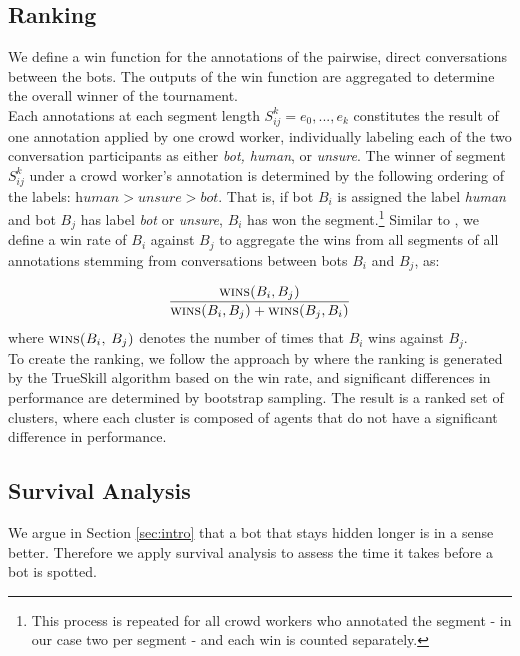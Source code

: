 \documentclass[11pt,a4paper]{article}
\begin{document}
\subsection{Ranking}
We define a win function for the annotations of the pairwise, direct conversations between the bots. The outputs of the win function are aggregated to determine the overall winner of the tournament. \\
 Each annotations at each segment length $S_{ij}^k = e_0, ... , e_{k}$ constitutes the result of one annotation applied by one crowd worker, individually labeling each of the two conversation participants as either \textit{bot, human}, or \textit{unsure}. The winner of segment $S_{ij}^k$ under a crowd worker's annotation is determined by the following ordering of the labels: $\textit{human} >  \textit{unsure} > \textit{bot}$. That is, if bot $B_i$ is assigned the label \textit{human} and bot $B_j$ has label \textit{bot} or \textit{unsure}, $B_i$ has won the segment.\footnote{This process is repeated for all crowd workers who annotated the segment - in our case two per segment - and each win is counted separately.} Similar to ,  we define a win rate of $B_i$ against $B_j$ to aggregate the wins from all segments of all annotations stemming from conversations between bots $B_i$ and $B_j$, as: 

\begin{equation}\label{eq:win_function}
    \frac{\textsc{wins($B_i, B_j$)}}{\textsc{wins($B_i, B_j$)} + \textsc{wins($B_j, B_i$)}}
\end{equation}
where $\textsc{wins($B_i$, $B_j$)}$ denotes the number of times that $B_i$ wins against $B_j$. \\
 To create the ranking, we follow the approach by  where the ranking is generated by the TrueSkill algorithm based on the win rate, and significant differences in performance are determined by bootstrap sampling. The result is a ranked set of clusters, where each cluster is composed of agents that do not have a significant difference in performance. 

\subsection{Survival Analysis}

We argue in Section \ref{sec:intro} that a bot that stays hidden longer is in a sense better. Therefore we apply survival analysis to assess the time it takes before a bot is spotted.
\end{document}
